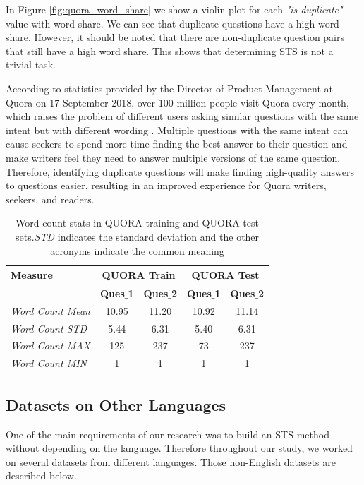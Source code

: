 \begin{enumerate}
In Figure \ref{fig:quora_word_share} we show a violin plot for each \textit{"is-duplicate"} value with word share. We can see that duplicate questions have a high word share. However, it should be noted that there are non-duplicate question pairs that still have a high word share. This shows that determining STS is not a trivial task. 

According to statistics provided by the Director of Product Management at Quora on 17 September 2018, over 100 million people visit Quora every month, which raises the problem of different users asking similar questions with the same intent but with different wording \autocite{8967103}. Multiple questions with the same intent can cause seekers to spend more time finding the best answer to their question and make writers feel they need to answer multiple versions of the same question. Therefore, identifying duplicate questions will make finding high-quality answers to questions easier, resulting in an improved experience for Quora writers, seekers, and readers.


\begin{table}
	\centering
	\begin{tabular}{l|cc|cc}
		\hline
		Measure   & \multicolumn{2}{c|}{QUORA Train} & \multicolumn{2}{c}{QUORA Test} \\
		\hline
		\multicolumn{1}{l|}{} & \textbf{Ques$\_$1} & \textbf{Ques$\_$2} & \textbf{Ques$\_$1} & \textbf{Ques$\_$2} \\
		\textit{Word Count Mean} & 10.95 & 11.20 & 10.92 & 11.14  \\
		\textit{Word Count STD} & 5.44 & 6.31 & 5.40 & 6.31  \\
		\textit{Word Count MAX} & 125 & 237 & 73 & 237  \\
		\textit{Word Count MIN} & 1 & 1 & 1 & 1  \\
		\hline
	\end{tabular}
	\caption[Word count stats in QUORA]{Word count stats in QUORA training and QUORA test sets.\textit{STD} indicates the standard deviation and the other acronyms indicate the common meaning }
	\label{table:quora_sts}
\end{table}
 
  


\end{enumerate}

\subsection{Datasets on Other Languages}
One of the main requirements of our research was to build an STS method without depending on the language. Therefore throughout our study, we worked on several datasets from different languages. Those non-English datasets are described below. 

